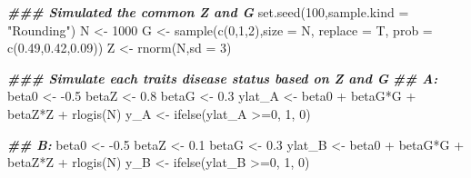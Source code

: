 \documentclass[
]{article}
\newenvironment{Shaded}{\begin{snugshade}}{\end{snugshade}}
\newcommand{\AttributeTok}[1]{\textcolor[rgb]{0.77,0.63,0.00}{#1}}
\newcommand{\DecValTok}[1]{\textcolor[rgb]{0.00,0.00,0.81}{#1}}
\newcommand{\DocumentationTok}[1]{\textcolor[rgb]{0.56,0.35,0.01}{\textbf{\textit{#1}}}}
\newcommand{\FloatTok}[1]{\textcolor[rgb]{0.00,0.00,0.81}{#1}}
\newcommand{\FunctionTok}[1]{\textcolor[rgb]{0.00,0.00,0.00}{#1}}
\newcommand{\NormalTok}[1]{#1}
\newcommand{\OtherTok}[1]{\textcolor[rgb]{0.56,0.35,0.01}{#1}}
\newcommand{\SpecialCharTok}[1]{\textcolor[rgb]{0.00,0.00,0.00}{#1}}
\newcommand{\StringTok}[1]{\textcolor[rgb]{0.31,0.60,0.02}{#1}}
\begin{document}
\begin{Shaded}
\begin{Highlighting}[]
\DocumentationTok{\#\#\# Simulated the common Z and G}
\FunctionTok{set.seed}\NormalTok{(}\DecValTok{100}\NormalTok{,}\AttributeTok{sample.kind =} \StringTok{"Rounding"}\NormalTok{)}
\NormalTok{N }\OtherTok{\textless{}{-}} \DecValTok{1000}
\NormalTok{G }\OtherTok{\textless{}{-}} \FunctionTok{sample}\NormalTok{(}\FunctionTok{c}\NormalTok{(}\DecValTok{0}\NormalTok{,}\DecValTok{1}\NormalTok{,}\DecValTok{2}\NormalTok{),}\AttributeTok{size =}\NormalTok{ N, }\AttributeTok{replace =}\NormalTok{ T, }\AttributeTok{prob =} \FunctionTok{c}\NormalTok{(}\FloatTok{0.49}\NormalTok{,}\FloatTok{0.42}\NormalTok{,}\FloatTok{0.09}\NormalTok{))}
\NormalTok{Z }\OtherTok{\textless{}{-}} \FunctionTok{rnorm}\NormalTok{(N,}\AttributeTok{sd =} \DecValTok{3}\NormalTok{)}


\DocumentationTok{\#\#\# Simulate each trait\textquotesingle{}s disease status based on Z and G}
\DocumentationTok{\#\# A:}
\NormalTok{beta0 }\OtherTok{\textless{}{-}} \SpecialCharTok{{-}}\FloatTok{0.5}
\NormalTok{betaZ }\OtherTok{\textless{}{-}} \FloatTok{0.8}
\NormalTok{betaG }\OtherTok{\textless{}{-}} \FloatTok{0.3}
\NormalTok{ylat\_A }\OtherTok{\textless{}{-}}\NormalTok{ beta0 }\SpecialCharTok{+}\NormalTok{ betaG}\SpecialCharTok{*}\NormalTok{G }\SpecialCharTok{+}\NormalTok{ betaZ}\SpecialCharTok{*}\NormalTok{Z }\SpecialCharTok{+} \FunctionTok{rlogis}\NormalTok{(N)}
\NormalTok{y\_A }\OtherTok{\textless{}{-}} \FunctionTok{ifelse}\NormalTok{(ylat\_A }\SpecialCharTok{\textgreater{}=}\DecValTok{0}\NormalTok{, }\DecValTok{1}\NormalTok{, }\DecValTok{0}\NormalTok{)}

\DocumentationTok{\#\# B:}
\NormalTok{beta0 }\OtherTok{\textless{}{-}} \SpecialCharTok{{-}}\FloatTok{0.5}
\NormalTok{betaZ }\OtherTok{\textless{}{-}} \FloatTok{0.1}
\NormalTok{betaG }\OtherTok{\textless{}{-}} \FloatTok{0.3}
\NormalTok{ylat\_B }\OtherTok{\textless{}{-}}\NormalTok{ beta0 }\SpecialCharTok{+}\NormalTok{ betaG}\SpecialCharTok{*}\NormalTok{G }\SpecialCharTok{+}\NormalTok{ betaZ}\SpecialCharTok{*}\NormalTok{Z }\SpecialCharTok{+} \FunctionTok{rlogis}\NormalTok{(N)}
\NormalTok{y\_B }\OtherTok{\textless{}{-}} \FunctionTok{ifelse}\NormalTok{(ylat\_B }\SpecialCharTok{\textgreater{}=}\DecValTok{0}\NormalTok{, }\DecValTok{1}\NormalTok{, }\DecValTok{0}\NormalTok{)}




\end{Highlighting}
\end{Shaded}
\end{document}
